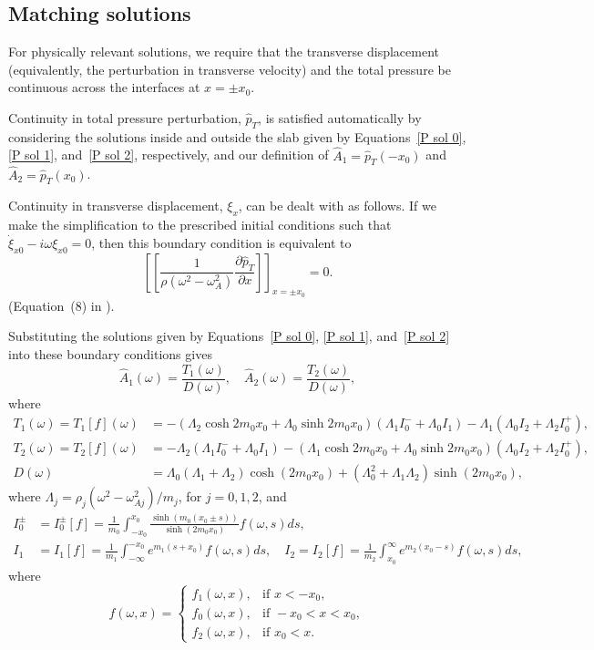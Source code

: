 \documentclass[12pt]{../style-files/ociamthesis}
\begin{document}
\subsection{Matching solutions}
For physically relevant solutions, we require that the transverse displacement (equivalently, the perturbation in transverse velocity) and the total pressure be continuous across the interfaces at $x = \pm x_0$.

Continuity in total pressure perturbation, $\hat{p}_T$, is satisfied automatically by considering the solutions inside and outside the slab given by Equations~\eqref{P sol 0}, \eqref{P sol 1}, and~\eqref{P sol 2}, respectively, and our definition of $\hat{A}_1 = \hat{p}_T(-x_0)$ and $\hat{A}_2 = \hat{p}_T(x_0)$.

Continuity in transverse displacement, $\xi_x$, can be dealt with as follows. If we make the simplification to the prescribed initial conditions such that $\dot{\xi}_{x0} - i\omega\xi_{x0} = 0$, then this boundary condition is equivalent to
\begin{equation}
\left[ \left[ \frac{1}{\rho(\omega^2 - \omega_A^2)} \frac{\partial \hat{p}_T}{\partial x} \right] \right]_{x=\pm x_0} = 0.
\end{equation}
(Equation~(8) in \cite{and_etal07}).

Substituting the solutions given by Equations~\eqref{P sol 0}, \eqref{P sol 1}, and~\eqref{P sol 2} into these boundary conditions gives
\begin{equation}
\hat{A}_1(\omega) = \frac{T_1(\omega)}{D(\omega)}, \quad \hat{A}_2(\omega) = \frac{T_2(\omega)}{D(\omega)},
\end{equation}
where
\begin{align}
T_1(\omega) = T_1[f](\omega) & = -(\Lambda_2\cosh{2m_0 x_0} + \Lambda_0\sinh{2m_0 x_0})(\Lambda_1 I_0^- + \Lambda_0 I_1) - \Lambda_1(\Lambda_0 I_2 + \Lambda_2 I_0^+), \\
T_2(\omega) = T_2[f](\omega) & = -\Lambda_2(\Lambda_1 I_0^- + \Lambda_0 I_1) - (\Lambda_1\cosh{2m_0 x_0} + \Lambda_0\sinh{2m_0 x_0})(\Lambda_0 I_2 + \Lambda_2 I_0^+), \\
D(\omega) & = \Lambda_0(\Lambda_1 + \Lambda_2)\cosh(2m_0x_0) + (\Lambda_0^2 + \Lambda_1\Lambda_2)\sinh(2m_0x_0),
\label{D}
\end{align}
where $\Lambda_j = \rho_j (\omega^2 - \omega_{Aj}^2) /  m_j$, for $j = 0, 1, 2$, and
\begin{align}
I_0^\pm &= I_0^\pm[f] = \frac{1}{m_0} \int_{-x_0}^{x_0} \frac{\sinh(m_0(x_0 \pm s))}{\sinh(2m_0x_0)} f(\omega, s) ds, \\
I_1 &= I_1[f] = \frac{1}{m_1} \int_{-\infty}^{-x_0} e^{m_1(s + x_0)} f(\omega, s) ds,
\quad
I_2 = I_2[f] = \frac{1}{m_2} \int_{x_0}^\infty e^{m_2(x_0 - s)} f(\omega, s) ds,
\end{align}
where
\begin{equation}
f(\omega, x) = \begin{cases}
f_1(\omega, x), &\text{if } x < -x_0, \\
f_0(\omega, x), &\text{if } -x_0 < x < x_0, \\
f_2(\omega, x), &\text{if } x_0 < x.
\end{cases}
\end{equation}
\end{document}
